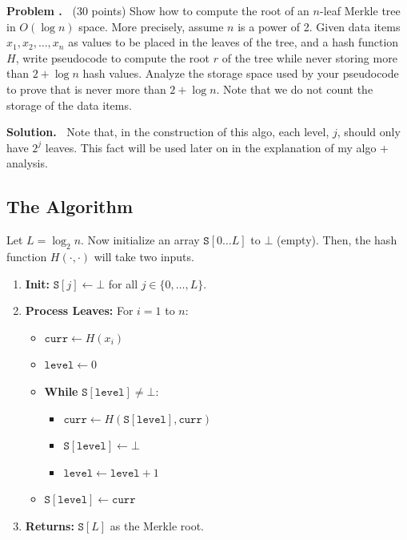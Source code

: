 \documentclass[12pt]{article}
\theoremstyle{definition}
\newcommand{\addbigskip}{\addvspace{\bigskipamount}}
\newcounter{problemnum}
\newenvironment{problem}
     {\addbigskip \setcounter{partnum}{0}
      \noindent\stepcounter{problemnum}\textbf{Problem
                                             \arabic{problemnum}.\ }}
     {\par\addbigskip}
\newenvironment{solution}
     {\addbigskip
      \noindent\color{blue}\textbf{Solution.\ }}
     {\par\addbigskip}
\newenvironment{solution}
     {\comment}
     {\endcomment}
\newcounter{partnum}
\begin{document}
\begin{problem} (30 points)
	Show how to compute the root of an $n$-leaf Merkle tree in $O(\log n)$ space.
	More precisely, assume $n$ is a power of 2.  Given data items $x_1, x_2, \dots, x_n$ as values to be placed in the
	leaves of the tree, and a hash function $H$, write pseudocode to compute the
	root $r$ of the tree while never storing more than $2+\log n$
	hash values. Analyze the storage space used by your pseudocode to prove that is never more than $2+\log n$. Note that we do not count the storage of the data items. 
\end{problem}
  
\begin{solution}
Note that, in the construction of this algo, each level, $j$, should only have $2^j$ leaves. This fact will be used later on in the explanation of my algo + analysis.

\subsection*{The Algorithm}
Let $L = \log_2 n$. Now initialize an array $\texttt{S}[0 \dots L]$ to $\bot$ (empty). Then, the hash function $H(\cdot, \cdot)$ will take two inputs.

\begin{enumerate}
    \item \textbf{Init:} $\texttt{S}[j] \leftarrow \bot$ for all $j \in \{0, \dots, L\}$.
    \item \textbf{Process Leaves:} For $i = 1$ to $n$:
    \begin{itemize}
        \item $\texttt{curr} \leftarrow H(x_i)$
        \item $\texttt{level} \leftarrow 0$
        \item \textbf{While} $\texttt{S}[\texttt{level}] \neq \bot$:
        \begin{itemize}
            \item $\texttt{curr} \leftarrow H(\texttt{S}[\texttt{level}], \texttt{curr})$
            \item $\texttt{S}[\texttt{level}] \leftarrow \bot$
            \item $\texttt{level} \leftarrow \texttt{level} + 1$
        \end{itemize}
        \item $\texttt{S}[\texttt{level}] \leftarrow \texttt{curr}$
    \end{itemize}
    \item \textbf{Returns:} $\texttt{S}[L]$ as the Merkle root.
\end{enumerate}


\end{solution}
\end{document}
